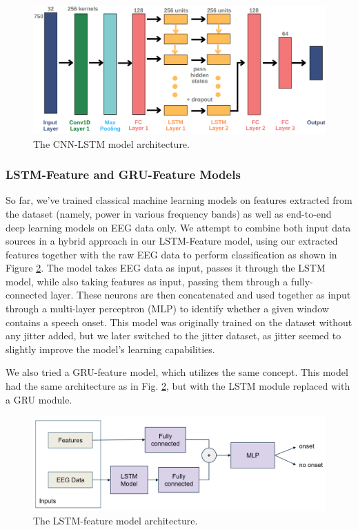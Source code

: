 \documentclass[format=sigconf, nonacm=true, review=false, screen=true]{acmart}
\begin{document}
\begin{figure}[H]
    \centering
    \includegraphics[width=\columnwidth]{figures/cnn-lstm-arch.png}
    \caption{The CNN-LSTM model architecture.}
    \label{fig:cnn-lstm-arch}
\end{figure}

\subsubsection{LSTM-Feature and GRU-Feature Models}
So far, we've trained classical machine learning models on features extracted from the dataset (namely, power in various frequency bands) as well as end-to-end deep learning models on EEG data only. We attempt to combine both input data sources in a hybrid approach in our LSTM-Feature model, using our extracted features together with the raw EEG data to perform classification as shown in Figure \ref{fig:lstm_feature_model}. The model takes EEG data as input, passes it through the LSTM model, while also taking features as input, passing them through a fully-connected layer. These neurons are then concatenated and used together as input through a multi-layer perceptron (MLP) to identify whether a given window contains a speech onset. This model was originally trained on the dataset without any jitter added, but we later switched to the jitter dataset, as jitter seemed to slightly improve the model's learning capabilities. 

We also tried a GRU-feature model, which utilizes the same concept. This model had the same architecture as in Fig. \ref{fig:lstm_feature_model}, but with the LSTM module replaced with a GRU module. 

\begin{figure}[H]
    \centering
    \includegraphics[width=\columnwidth]{figures/lstm-feature-model.png}
    \caption{The LSTM-feature model architecture.}
    \label{fig:lstm_feature_model}
\end{figure}
\end{document}
